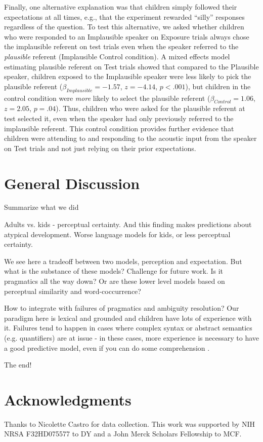 \documentclass[man,floatsintext]{apa6}
\begin{document}
Finally, one alternative explanation was that children simply followed their expectations at all times, e.g., that the experiment rewarded ``silly'' responses regardless of the question. To test this alternative, we asked whether children who were responded to an Implausible speaker on Exposure trials always chose the implausible referent on test trials even when the speaker referred to the \emph{plausible} referent (Implausible Control condition). A mixed effects model estimating plausible referent on Test trials showed that compared to the Plausible speaker, children exposed to the Implausible speaker were less likely to pick the plausible referent ($\beta_{Implausible} = -1.57$,  $z = -4.14$, $p <.001$), but children in the control condition were \emph{more} likely to select the plausible referent ($\beta_{Control} = 1.06$,  $z = 2.05$, $p = .04$). Thus, children who were asked for the plausible referent at test selected it, even when the speaker had only previously referred to the implausible referent. This control condition provides further evidence that children were attending to and responding to the acoustic input from the speaker on Test trials and not just relying on their prior expectations.


\section{General Discussion}

Summarize what we did

Adults vs. kids - perceptual certainty. And this finding makes predictions about atypical development. Worse language models for kids, or less perceptual certainty. 

We see here a tradeoff between two models, perception and expectation. But what is the substance of these models? Challenge for future work. Is it pragmatics all the way down? Or are these lower level models based on perceptual similarity and word-coccurrence?

How to integrate with failures of pragmatics and ambiguity resolution? Our paradigm here is lexical and grounded and children have lots of experience with it. Failures tend to happen in cases where complex syntax or abstract semantics (e.g. quantifiers) are at issue - in these cases, more experience is necessary to have a good predictive model, even if you can do some comprehension \cite{barner2011, montag2015}. 

The end!

\section{Acknowledgments}

Thanks to Nicolette Castro for data collection. This work was supported by NIH NRSA F32HD075577 to DY and a John Merck Scholars Fellowship to MCF.



\end{document}
